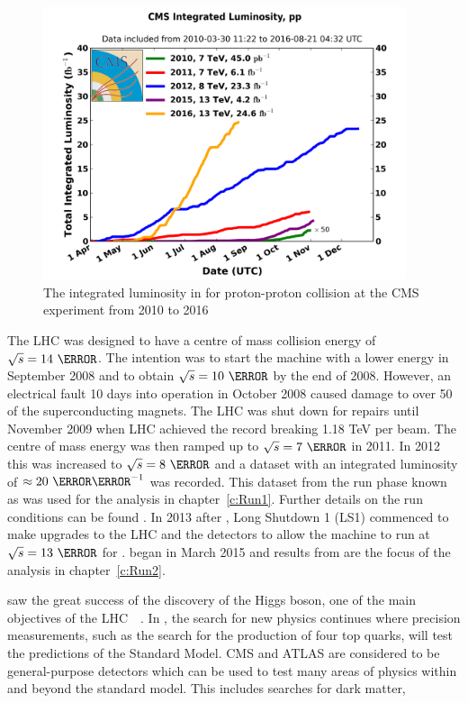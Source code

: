 \begin{figure}[ht!]
\centering
    \includegraphics[width=0.95\textwidth]{images/int_lumi_cumulative_pp_2.png}
    \caption{The integrated luminosity in \fbinv for proton-proton collision at the CMS experiment from 2010 to 2016}
    \label{fig:Lumi}
\end{figure}

The LHC was designed to have a centre of mass collision energy of $\sqrt{s} = 14~\TeV$. The intention was to start the machine with a lower energy in September 2008 and to obtain $\sqrt{s} = 10~\TeV$ by the end of 2008. However, an electrical fault 10 days into operation in October 2008 caused damage to over 50 of the superconducting magnets. The LHC was shut down for repairs until November 2009 when LHC achieved the record breaking 1.18 TeV per beam. The centre of mass energy was then ramped up to $\sqrt{s} = 7~\TeV$ in 2011. In 2012 this was increased to $\sqrt{s} = 8~\TeV$ and a dataset with an integrated luminosity of $\approx 20~\fbinv$ was recorded. This dataset from the run phase known as \emph{\runone} was used for the analysis in chapter~\ref{c:Run1}. Further details on the run conditions can be found . In 2013 after \runone, Long Shutdown 1 (LS1) commenced to make upgrades to the LHC and the detectors to allow the machine to run at $\sqrt{s} = 13~\TeV$ for \emph{\runtwo}. \runtwo began in March 2015 and results from \runtwo are the focus of the analysis in chapter~\ref{c:Run2}.

\runone saw the great success of the discovery of the Higgs boson, one of the main objectives of the LHC~\cite{Aad20121}~\cite{Chatrchyan201230}. In \runtwo, the search for new physics continues where precision measurements, such as the search for the production of four top quarks, will test the predictions of the Standard Model. CMS and ATLAS are considered to be general-purpose detectors which can be used to test many areas of physics within and beyond the standard model. This includes searches for dark matter, 

